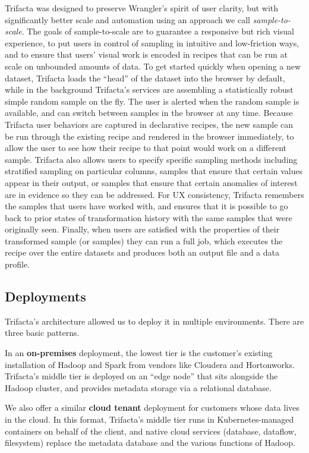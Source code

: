 \documentclass[11pt]{article}
\begin{document}
Trifacta was designed to preserve Wrangler's spirit of user clarity, but with significantly better scale and automation using an approach we call \emph{sample-to-scale}. The goals of sample-to-scale are to guarantee a responsive but rich visual experience, to put users in control of sampling in intuitive and low-friction ways, and to ensure that users' visual work is encoded in recipes that can be run at scale on unbounded amounts of data.  To get started quickly when opening a new dataset, Trifacta loads the ``head'' of the dataset into the browser by default, while in the background Trifacta's services are assembling a statistically robust simple random sample on the fly. The user is alerted when the random sample is available, and can switch between samples in the browser at any time. Because Trifacta user behaviors are captured in declarative recipes, the new sample can be run through the existing recipe and rendered in the browser immediately, to allow the user to see how their recipe to that point would work on a different sample. Trifacta also allows users to specify specific sampling methods including stratified sampling on particular columns, samples that ensure that certain values appear in their output, or samples that ensure that certain anomalies of interest are in evidence so they can be addressed. For UX consistency, Trifacta remembers the samples that users have worked with, and ensures that it is possible to go back to prior states of transformation history with the same samples that were originally seen. Finally, when users are satisfied with the properties of their transformed sample (or samples) they can run a full job, which executes the recipe over the entire datasets and produces both an output file and a data profile. 

\subsection{Deployments}
Trifacta's architecture allowed us to deploy it in multiple environments. There are three basic patterns. 

In an \textbf{on-premises} deployment, the lowest tier is the customer's existing installation of Hadoop and Spark from vendors like Cloudera and Hortonworks. Trifacta's middle tier is deployed on an ``edge node'' that sits alongside the Hadoop cluster, and provides metadata storage via a relational database. 

We also offer a similar \textbf{cloud tenant} deployment for customers whose data lives in the cloud. In this format, Trifacta's middle tier runs in Kubernetes-managed containers on behalf of the client, and native cloud services (database, dataflow, filesystem) replace the metadata database and the various functions of Hadoop.
\end{document}
